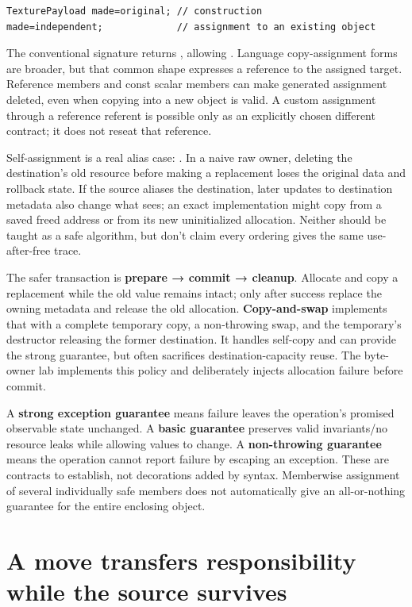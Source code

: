 \begin{verbatim}
TexturePayload made=original; // construction
made=independent;             // assignment to an existing object
\end{verbatim}

The conventional signature  returns , allowing . Language copy-assignment forms are broader, but that common shape expresses a reference to the assigned target. Reference members and const scalar members can make generated assignment deleted, even when copying into a new object is valid. A custom assignment through a reference referent is possible only as an explicitly chosen different contract; it does not reseat that reference.

Self-assignment is a real alias case: . In a naive raw owner, deleting the destination's old resource before making a replacement loses the original data and rollback state. If the source aliases the destination, later updates to destination metadata also change what  sees; an exact implementation might copy from a saved freed address or from its new uninitialized allocation. Neither should be taught as a safe algorithm, but don't claim every ordering gives the same use-after-free trace.

The safer transaction is \textbf{prepare → commit → cleanup}. Allocate and copy a replacement while the old value remains intact; only after success replace the owning metadata and release the old allocation. \textbf{Copy-and-swap} implements that with a complete temporary copy, a non-throwing swap, and the temporary's destructor releasing the former destination. It handles self-copy and can provide the strong guarantee, but often sacrifices destination-capacity reuse. The byte-owner lab implements this policy and deliberately injects allocation failure before commit.

A \textbf{strong exception guarantee} means failure leaves the operation's promised observable state unchanged. A \textbf{basic guarantee} preserves valid invariants/no resource leaks while allowing values to change. A \textbf{non-throwing guarantee} means the operation cannot report failure by escaping an exception. These are contracts to establish, not decorations added by syntax. Memberwise assignment of several individually safe members does not automatically give an all-or-nothing guarantee for the entire enclosing object.

\section{A move transfers responsibility while the source survives}\label{05-engine-i-ch003-a-move-transfers-responsibility-while-the-source-survives}

